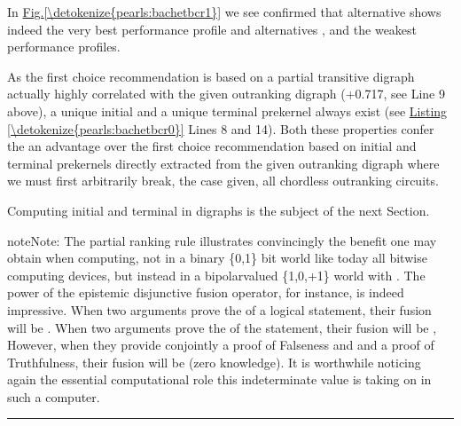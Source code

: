 \documentclass[a4paper,12pt,english]{sphinxhowto}
\begin{document}
\sphinxAtStartPar
In \hyperref[\detokenize{pearls:bachetbcr1}]{Fig.\@ \ref{\detokenize{pearls:bachetbcr1}}} we see confirmed that alternative  shows indeed the very best performance profile and alternatives ,  and  the weakest performance profiles.

\sphinxAtStartPar
As the  first choice recommendation is based on a partial transitive digraph actually highly correlated with the given outranking digraph  (+0.717, see Line 9 above), a unique initial and a unique terminal prekernel always exist (see \hyperref[\detokenize{pearls:bachetbcr0}]{Listing \ref{\detokenize{pearls:bachetbcr0}}} Lines 8 and 14). Both these properties confer the  an advantage over the first choice recommendation based on initial and terminal prekernels directly extracted from the given outranking digraph where we must first arbitrarily break, the case given, all chordless outranking circuits.

\sphinxAtStartPar
Computing initial and terminal  in digraphs is the subject of the next Section.

\begin{sphinxadmonition}{note}{Note:}
\sphinxAtStartPar
The partial  ranking rule illustrates convincingly the benefit one may obtain when computing, not in a binary \{0,1\} bit world like today all bit\sphinxhyphen{}wise computing devices, but instead in a bipolar\sphinxhyphen{}valued \{\sphinxhyphen{}1,0,+1\} world with . The power of the epistemic disjunctive fusion operator, for instance, is indeed impressive. When two arguments prove the  of a logical statement, their fusion will be . When two arguments prove the  of the statement, their fusion will be , However, when they provide conjointly a proof of Falseness and and a proof of Truthfulness, their fusion will be  (zero knowledge). It is worthwhile noticing again the essential computational role this indeterminate  value is taking on in such a  computer.
\end{sphinxadmonition}


\bigskip\hrule\bigskip
\end{document}
